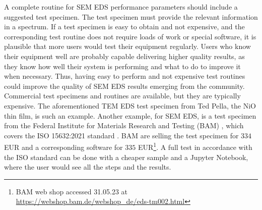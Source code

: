 A complete routine for SEM EDS performance parameters should include a suggested test specimen.
The test specimen must provide the relevant information in a spectrum.
If a test specimen is easy to obtain and not expensive, and the corresponding test routine does not require loads of work or special software, it is plausible that more users would test their equipment regularly.
Users who know their equipment well are probably capable delivering higher quality results, as they know how well their system is performing and what to do to improve it when necessary.
Thus, having easy to perform and not expensive test routines could improve the quality of SEM EDS results emerging from the community.
Commercial test specimens and routines are available, but they are typically expensive.
The aforementioned TEM EDS test specimen from Ted Pella, the NiO thin film, is such an example.
Another example, for SEM EDS, is a test specimen from the Federal Institute for Materials Research and Testing (BAM) \cite{rackwitz_2015_bam}, which covers the ISO 15632:2021 standard \cite{iso_qc_15632}.
BAM are selling the test specimen for  $334$ EUR and a corresponding software for $335$ EUR\footnote{BAM web shop accessed 31.05.23 at \url{https://webshop.bam.de/webshop_de/eds-tm002.html}}.
A full test in accordance with the ISO standard can be done with a cheaper sample and a Jupyter Notebook, where the user would see all the steps and the results.

